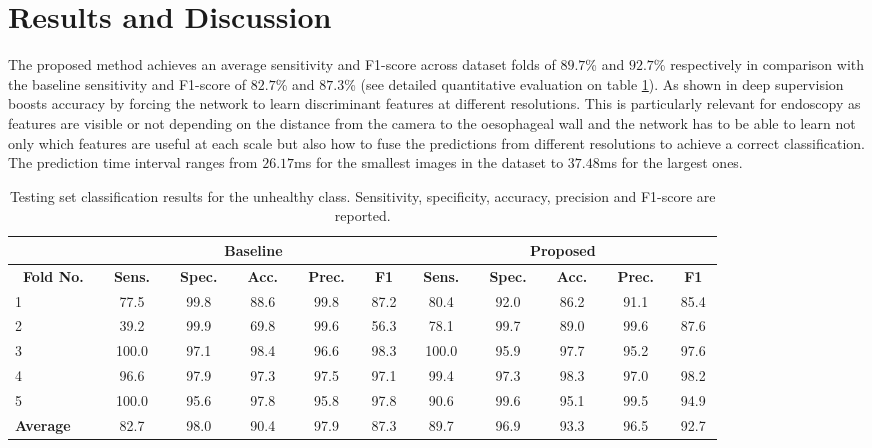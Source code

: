 \documentclass[runningheads]{llncs}
\begin{document}
\section{Results and Discussion}

The proposed method achieves an average sensitivity and F1-score across dataset folds of $89.7$\% and $92.7$\% respectively in comparison with the baseline sensitivity and F1-score of $82.7$\% and $87.3$\% (see detailed quantitative evaluation on table \ref{tab:results}). As shown in \cite{Xie2015} deep supervision boosts accuracy by forcing the network to learn discriminant features at different resolutions. This is particularly relevant for endoscopy as features are visible or not depending on the distance from the camera to the oesophageal wall and the network has to be able to learn not only which features are useful at each scale but also how to fuse the predictions from different resolutions to achieve a correct classification. The prediction time interval ranges from $26.17$ms for the smallest images in the dataset to $37.48$ms for the largest ones.

\begin{table}[t!]
	\centering
	\caption{Testing set classification results for the unhealthy class. Sensitivity, specificity, accuracy, precision and F1-score are reported.} 
	\begin{tabular}{l|ccccc|ccccc}
		\hline
		& \multicolumn{5}{c|}{\bfseries Baseline} & \multicolumn{5}{c}{\bfseries Proposed} \\
		\hline
		\multicolumn{1}{c|}{\bfseries ~Fold No.~} & \multicolumn{1}{c}{\bfseries ~Sens.~} & \multicolumn{1}{c}{\bfseries ~Spec.~} & \multicolumn{1}{c}{\bfseries ~Acc.~} & \multicolumn{1}{c}{\bfseries ~Prec.~} & \multicolumn{1}{c|}{\bfseries ~F1~} & \multicolumn{1}{c}{\bfseries ~Sens.~} & \multicolumn{1}{c}{\bfseries ~Spec.~} & \multicolumn{1}{c}{\bfseries ~Acc.~} & \multicolumn{1}{c}{\bfseries ~Prec.~} & \multicolumn{1}{c}{\bfseries ~F1~}\\ \hline
		
		1 &  77.5 & 99.8 & 88.6 & 99.8 & 87.2 & 80.4   &  92.0  &  86.2  &  91.1  &  85.4 \\
		
		2 &  39.2 & 99.9 & 69.8 & 99.6 & 56.3 & 78.1   &  99.7  &  89.0  &  99.6  &  87.6 \\
		
		3 &  100.0 & 97.1 & 98.4 & 96.6 & 98.3 & 100.0  &  95.9  &  97.7  &  95.2  &  97.6 \\
		
		4 &  96.6 & 97.9 & 97.3 & 97.5 & 97.1 & 99.4   &  97.3  &  98.3  &  97.0  &  98.2 \\
		
		5 &  100.0 & 95.6 & 97.8 & 95.8 & 97.8 & 90.6   &  99.6  &  95.1  &  99.5  &  94.9 \\ \hline
		
		\textbf{Average} & 82.7 & 98.0 & 90.4 & 97.9 & 87.3 & 89.7  &  96.9  &  93.3  &  96.5  &  92.7 \\ \hline
		
	\end{tabular}
	\vspace{0.2cm}
	\label{tab:results}
\end{table}
\end{document}
